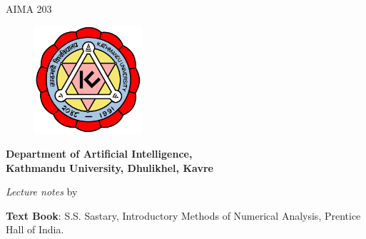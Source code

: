 \vspace*{2cm}
{\begin{center}
  {\Huge
    {\bfseries {\thetitle}}} \\
        \vspace{5mm}
        {\large AIMA 203}
  \vspace{3cm}

\begin{figure}[h]
	\centering
	\includegraphics[height=4cm,width=4cm]{images/Kulogo.png}
\end{figure}

\vspace{1cm}

	{\large \bfseries Department of Artificial Intelligence, \\[1mm]
 Kathmandu University, Dhulikhel, Kavre}

\vspace{2cm}
        \textit{Lecture notes}
	by\\
	{\bfseries  \theauthor}

\vspace{1cm}

    \textbf{Text Book}: S.S. Sastary, Introductory Methods of Numerical Analysis, Prentice Hall of India.
    \vspace{1.5cm}

{\thedate}

\thispagestyle{empty}
\end{center}}


\clearpage
